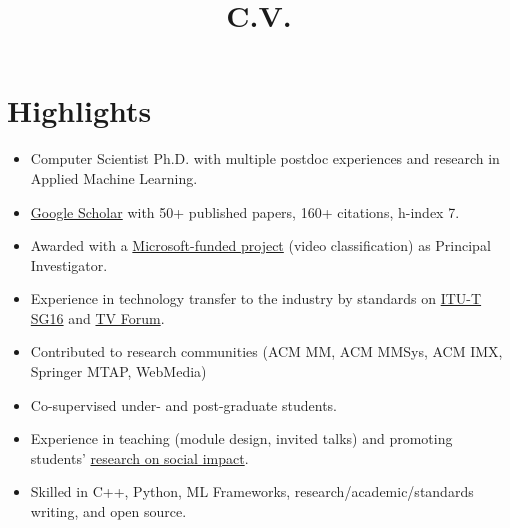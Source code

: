 \documentclass[10pt,a4paper,sans,colorlinks]{moderncv}
\title{C.V.}
\begin{document}
\setHyperrefBlueLinks
\makecvtitle
\vspace{-2em}

\section{Highlights}

\begin{itemize}
    \item Computer Scientist Ph.D. with multiple postdoc experiences and research in Applied Machine Learning.
    \item \href{https://scholar.google.com/citations?user=1bEOmkUAAAAJ&hl=en}{Google Scholar} with 50+ published papers, 160+ citations, h-index 7.
    \item Awarded with a \href{https://www.rnp.br/en/rnp-and-microsoft-challenge-artificial-intelligence}{Microsoft-funded project} (video classification) as Principal Investigator.
    \item Experience in technology transfer to the industry by standards on \href{http://www.itu.int/en/ITU-T/studygroups/2022-2024/16}{ITU-T SG16} and \href{http://forumsbtvd.org.br}{TV Forum}.
    \item Contributed to research communities (ACM MM, ACM MMSys, ACM IMX, Springer MTAP, WebMedia)
    \item Co-supervised under- and post-graduate students.
    \item Experience in teaching  (module design, invited talks) and promoting students' \href{https://webmedia.org.br/2022/en/lf-award/}{research on social impact}.
    \item Skilled in C++, Python, ML Frameworks, research/academic/standards writing, and open source.
\end{itemize}


\end{document}
